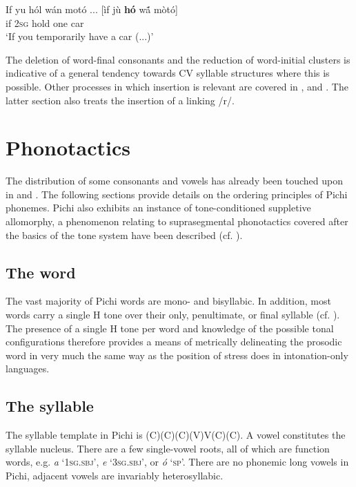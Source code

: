 \ea%
    \label{ex:key:40}
    \gll   If  yu  hól    wán    motó  \op...\cp{}      \textup{[ìf  jù  \textbf{hó}  w\'{ã}   mòtó]}\\
if  \textsc{2sg}  hold    one    car\\

\glt ‘If you temporarily have a car (...)’
\z

The deletion of word-final consonants and the reduction of word-initial clusters is indicative of a general tendency towards CV syllable structures where this is possible. Other processes in which insertion is relevant are covered in ,  and . The latter section also treats the insertion of a linking /r/.

\section{Phonotactics}\label{sec:2.6}

The distribution of some consonants and vowels has already been touched upon in  and . The following sections provide details on the ordering principles of Pichi phonemes. Pichi also exhibits an instance of tone-conditioned suppletive allomorphy, a phenomenon relating to suprasegmental phonotactics covered after the basics of the tone system have been described (cf. ).

\subsection{The word}\label{sec:2.6.1}

The vast majority of Pichi words are mono- and bisyllabic. In addition, most words carry a single H tone over their only, penultimate, or final syllable (cf. ). The presence of a single H tone per word and knowledge of the possible tonal configurations therefore provides a means of metrically delineating the prosodic word in very much the same way as the position of stress does in intonation-only languages.

\subsection{The syllable}\label{sec:2.6.2}

The syllable template in Pichi is (C)(C)(C)(V)V(C)(C). A vowel constitutes the syllable nucleus. There are a few single-vowel roots, all of which are function words, e.g. \textit{a} ‘\textsc{1sg.sbj}’, \textit{e} ‘\textsc{3sg.sbj}’, or \textit{ó} ‘\textsc{sp}’. There are no phonemic long vowels in Pichi, adjacent vowels are invariably heterosyllabic. 


